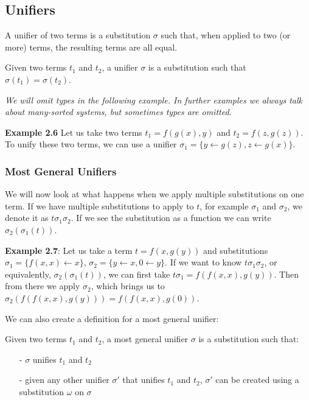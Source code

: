 \subsection{Unifiers}
A unifier of two terms is a substitution $\sigma$ such that, when applied to two (or more) terms, the resulting terms are all equal. 
\begin{definition}
Given two terms $t_1$ and $t_2$, a unifier $\sigma$ is a substitution such that $\sigma(t_1) = \sigma(t_2)$.
\end{definition}

\textit{We will omit types in the following example. In further examples we always talk about many-sorted systems, but sometimes types are omitted}.

\textbf{Example 2.6}  Let us take two terms $t_1 = f(g(x), y)$ and $t_2 = f(z, g(z))$. To unify these two terms, we can use a unifier $\sigma_1 = \{ y \leftarrow g(z), z \leftarrow g(x) \}$.

\subsubsection{Most General Unifiers}
We will now look at what happens when we apply multiple substitutions on one term. If we have multiple substitutions to apply to $t$, for example $\sigma_1$ and $\sigma_2$, we denote it as $t\sigma_1\sigma_2$. If we see the substitution as a function we can write $\sigma_2\left( 
\sigma_1(t)\right)$.

\textbf{Example 2.7}: Let us take a term $t = f(x, g(y))$ and substitutions $\sigma_1 = \{ f(x, x) \leftarrow x\}$, $\sigma_2 = \{ y \leftarrow x, 0 \leftarrow y \}$. If we want to know $t\sigma_1\sigma_2$, or equivalently, $\sigma_2(\sigma_1(t))$, we can first take $t\sigma_1 = f(f(x, x), g(y))$. Then from there we apply $\sigma_2$, which brings us to $\sigma_2(f(f(x, x), g(y))) = f(f(x, x), g(0))$.

We can also create a definition for a most general unifier:
\begin{definition}
Given two terms $t_1$ and $t_2$, a most general unifier $\sigma$ is a substitution such that:
\begin{itemize}
    \itemsep -.4em
    \item[-] $\sigma$ unifies $t_1$ and $t_2$
    \item[-] given any other unifier $\sigma'$ that unifies $t_1$ and $t_2$, $\sigma'$ can be created using a substitution $\omega$ on $\sigma$
\end{itemize}
\end{definition}

